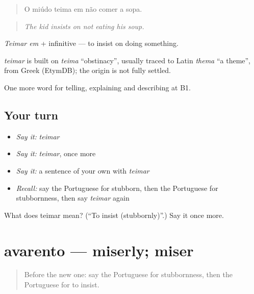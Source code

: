 \begin{quote}
O miúdo teima em não comer a sopa.
\end{quote}

\begin{quote}
\emph{The kid insists on not eating his soup.}
\end{quote}

\emph{Teimar em} + infinitive — to insist on doing something.

\begin{cousinweb}
\emph{teimar} is built on \emph{teima} \textquotedblleft{}obstinacy\textquotedblright{}, usually traced to Latin \emph{thema} \textquotedblleft{}a theme\textquotedblright{}, from Greek (EtymDB); the origin is not fully settled.
\end{cousinweb}

\begin{grammarlens}[title={What you've built}]
One more word for telling, explaining and describing at B1.
\end{grammarlens}

\subsection*{Your turn}
\begin{itemize}
\raggedright
  \item \emph{Say it:} \emph{teimar}
  \item \emph{Say it:} \emph{teimar}, once more
  \item \emph{Say it:} a sentence of your own with \emph{teimar}
  \item \emph{Recall:} say the Portuguese for stubborn, then the Portuguese for stubbornness, then say \emph{teimar} again
\end{itemize}

\begin{tcolorbox}[breakable,colback=teal!4,colframe=teal!35!black,title={Before you move on}]
What does teimar mean? (\textquotedblleft{}To insist (stubbornly)\textquotedblright{}.) Say it once more.
\end{tcolorbox}
\section[avarento]{avarento — miserly; miser}

\label{lesson:PT-C469-avarento}



\begin{quote}
Before the new one: say the Portuguese for stubbornness, then the Portuguese for to insist.
\end{quote}

